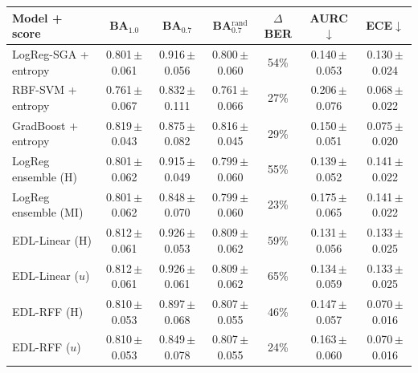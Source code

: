 \begin{tabular}{lcccccc}\toprule
Model + score & BA$_{1.0}$ & BA$_{0.7}$ & BA$_{0.7}^{\text{rand}}$ & $\Delta$BER & AURC$\downarrow$ & ECE$\downarrow$\\\midrule
LogReg-SGA + entropy & 0.801\,{\scriptsize$\pm$0.061} & 0.916\,{\scriptsize$\pm$0.056} & 0.800\,{\scriptsize$\pm$0.060} & 54\% & 0.140\,{\scriptsize$\pm$0.053} & 0.130\,{\scriptsize$\pm$0.024}\\
RBF-SVM + entropy & 0.761\,{\scriptsize$\pm$0.067} & 0.832\,{\scriptsize$\pm$0.111} & 0.761\,{\scriptsize$\pm$0.066} & 27\% & 0.206\,{\scriptsize$\pm$0.076} & 0.068\,{\scriptsize$\pm$0.022}\\
GradBoost + entropy & 0.819\,{\scriptsize$\pm$0.043} & 0.875\,{\scriptsize$\pm$0.082} & 0.816\,{\scriptsize$\pm$0.045} & 29\% & 0.150\,{\scriptsize$\pm$0.051} & 0.075\,{\scriptsize$\pm$0.020}\\
LogReg ensemble (H) & 0.801\,{\scriptsize$\pm$0.062} & 0.915\,{\scriptsize$\pm$0.049} & 0.799\,{\scriptsize$\pm$0.060} & 55\% & 0.139\,{\scriptsize$\pm$0.052} & 0.141\,{\scriptsize$\pm$0.022}\\
LogReg ensemble (MI) & 0.801\,{\scriptsize$\pm$0.062} & 0.848\,{\scriptsize$\pm$0.070} & 0.799\,{\scriptsize$\pm$0.060} & 23\% & 0.175\,{\scriptsize$\pm$0.065} & 0.141\,{\scriptsize$\pm$0.022}\\
EDL-Linear (H) & 0.812\,{\scriptsize$\pm$0.061} & 0.926\,{\scriptsize$\pm$0.053} & 0.809\,{\scriptsize$\pm$0.062} & 59\% & 0.131\,{\scriptsize$\pm$0.056} & 0.133\,{\scriptsize$\pm$0.025}\\
EDL-Linear ($u$) & 0.812\,{\scriptsize$\pm$0.061} & 0.926\,{\scriptsize$\pm$0.061} & 0.809\,{\scriptsize$\pm$0.062} & 65\% & 0.134\,{\scriptsize$\pm$0.059} & 0.133\,{\scriptsize$\pm$0.025}\\
EDL-RFF (H) & 0.810\,{\scriptsize$\pm$0.053} & 0.897\,{\scriptsize$\pm$0.068} & 0.807\,{\scriptsize$\pm$0.055} & 46\% & 0.147\,{\scriptsize$\pm$0.057} & 0.070\,{\scriptsize$\pm$0.016}\\
EDL-RFF ($u$) & 0.810\,{\scriptsize$\pm$0.053} & 0.849\,{\scriptsize$\pm$0.078} & 0.807\,{\scriptsize$\pm$0.055} & 24\% & 0.163\,{\scriptsize$\pm$0.060} & 0.070\,{\scriptsize$\pm$0.016}\\
\bottomrule\end{tabular}